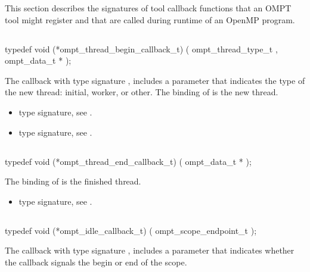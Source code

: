 This section describes the signatures of tool callback functions that an OMPT
tool might register and that are called during runtime of an OpenMP program.

\subsection{}
\label{subsec:ompt_thread_begin_callback_t}
\format
\begin{boxedcode}
typedef void (*ompt\_thread\_begin\_callback\_t) (
  ompt\_thread\_type\_t ,
  ompt\_data\_t *
);
\end{boxedcode}
\descr
The callback with type signature ,
includes a parameter 
that indicates the type of the new thread: initial, worker, or other.
The binding of  is the new thread.

\crossreferences
\begin{itemize}
\item {} type signature, see
.
\item {} type signature, see
.
\end{itemize}



\subsection{}
\label{subsec:ompt_thread_end_callback_t}
\format
\begin{boxedcode}
typedef void (*ompt\_thread\_end\_callback\_t) (
  ompt\_data\_t *
);
\end{boxedcode}
\descr
The binding of  is the finished thread.

\crossreferences
\begin{itemize}
\item {} type signature, see
.
\end{itemize}



\subsection{}
\label{subsec:ompt_idle_callback_t}
\format
\begin{boxedcode}
typedef void (*ompt\_idle\_callback\_t) (
  ompt\_scope\_endpoint\_t 
);
\end{boxedcode}
\descr
The callback with type signature ,
includes a parameter 
that indicates whether the callback signals the begin or end of the scope.

